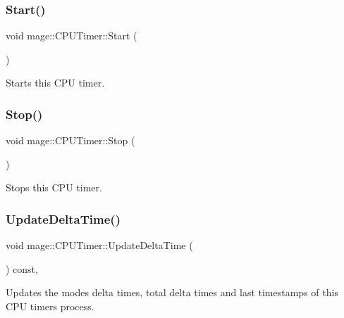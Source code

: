 \subsubsection{\texorpdfstring{Start()}{Start()}}
{\footnotesize\ttfamily void mage\+::\+C\+P\+U\+Timer\+::\+Start (\begin{DoxyParamCaption}{ }\end{DoxyParamCaption})\hspace{0.3cm}{\ttfamily [noexcept]}}

Starts this C\+PU timer. \hypertarget{classmage_1_1_c_p_u_timer_ae2fa5b36f436fd160d7f5b91783c0f11}{}\label{classmage_1_1_c_p_u_timer_ae2fa5b36f436fd160d7f5b91783c0f11} 
\subsubsection{\texorpdfstring{Stop()}{Stop()}}
{\footnotesize\ttfamily void mage\+::\+C\+P\+U\+Timer\+::\+Stop (\begin{DoxyParamCaption}{ }\end{DoxyParamCaption})\hspace{0.3cm}{\ttfamily [noexcept]}}

Stops this C\+PU timer. \hypertarget{classmage_1_1_c_p_u_timer_a4e82f7003a11e109495b7450e2f82f4f}{}\label{classmage_1_1_c_p_u_timer_a4e82f7003a11e109495b7450e2f82f4f} 
\subsubsection{\texorpdfstring{Update\+Delta\+Time()}{UpdateDeltaTime()}}
{\footnotesize\ttfamily void mage\+::\+C\+P\+U\+Timer\+::\+Update\+Delta\+Time (\begin{DoxyParamCaption}{ }\end{DoxyParamCaption}) const\hspace{0.3cm}{\ttfamily [private]}, {\ttfamily [noexcept]}}

Updates the modes\textquotesingle{} delta times, total delta times and last timestamps of this C\+PU timer\textquotesingle{}s process. \hypertarget{classmage_1_1_c_p_u_timer_aa956ede1a12c0c383e7fcc53e6f8c405}{}\label{classmage_1_1_c_p_u_timer_aa956ede1a12c0c383e7fcc53e6f8c405} 
